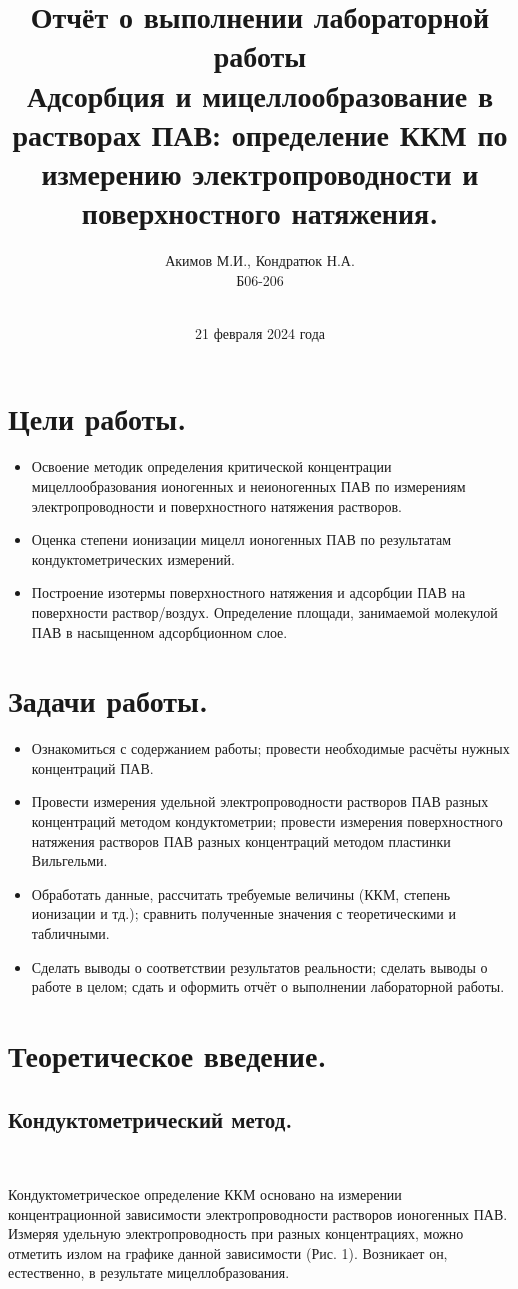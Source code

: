 \documentclass[a4paper, 11pt]{article}%
\author{Акимов М.И., Кондратюк Н.А. \\ Б06-206}
\title{Отчёт о выполнении лабораторной работы  \\ \textbf{Адсорбция и мицеллообразование в растворах ПАВ: определение ККМ
по измерению электропроводности и поверхностного натяжения.}}
\date{\\21 февраля 2024 года}
\begin{document}
    \maketitle

       \section{Цели работы.}
        \begin{itemize}
             \item Освоение методик определения критической концентрации мицеллообразования ионогенных и неионогенных ПАВ по измерениям электропроводности и поверхностного натяжения растворов.
             \item Оценка степени ионизации мицелл ионогенных ПАВ по результатам кондуктометрических измерений.
             \item Построение изотермы поверхностного натяжения и адсорбции ПАВ на поверхности раствор/воздух. Определение площади, занимаемой молекулой ПАВ в насыщенном адсорбционном слое.
        \end{itemize}

        \section{Задачи работы.}
         \begin{itemize}
             \item Ознакомиться с содержанием работы; провести необходимые расчёты нужных концентраций ПАВ.
             \item Провести измерения удельной электропроводности растворов ПАВ разных концентраций методом кондуктометрии; провести измерения поверхностного натяжения растворов ПАВ разных концентраций методом пластинки Вильгельми.
             \item Обработать данные, рассчитать требуемые величины (ККМ, степень ионизации и тд.); сравнить полученные значения с теоретическими и табличными.
             \item Сделать выводы о соответствии результатов реальности; сделать выводы о работе в целом; сдать и оформить отчёт о выполнении лабораторной работы.
        \end{itemize}
\newpage
\section{Теоретическое введение.}
\subsection{Кондуктометрический метод.}\,
\par Кондуктометрическое определение ККМ основано на измерении концентрационной зависимости электропроводности растворов ионогенных ПАВ. Измеряя удельную электропроводность при разных концентрациях, можно отметить излом на графике данной зависимости (Рис. 1). Возникает он, естественно, в результате мицеллобразования. 
\end{document}
